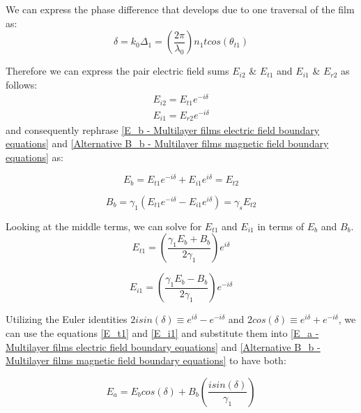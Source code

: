We can express the phase difference that develops due to one traversal of the film as:
    \begin{equation} \label{phase difference}
    \delta = k_0\Delta_1 = \left(\frac{2\pi}{\lambda_0}\right) n_1tcos(\theta_{t1})
    \end{equation}

Therefore we can express the pair electric field sums $E_{i2}$ \& $E_{t1}$ and $E_{i1}$ \& $E_{r2}$ as follows:
    \begin{align*}
        E_{i2} = E_{t1}e^{-i\delta} \\
        E_{i1} = E_{r2}e^{-i\delta}
    \end{align*}
and consequently rephrase \ref{E_b - Multilayer films electric field boundary equations} and \ref{Alternative B_b - Multilayer films magnetic field boundary equations} as:

    \begin{equation} \label{E_b form after phase difference}
    E_b = E_{t1}e^{-i\delta} + E_{i1}e^{i\delta} = E_{t2}
    \end{equation}
    
    \begin{equation} \label{B_b form after phase difference}
    B_b = \gamma_1(E_{t1}e^{-i\delta} - E_{i1}e^{i\delta}) = \gamma_sE_{t2}
    \end{equation}

Looking at the middle terms, we can solve for $E_{t1}$ and $E_{i1}$ in terms of $E_b$ and $B_b$.
    \begin{equation} \label{E_t1}
    E_{t1} = \left(\frac{\gamma_1E_b + B_b}{2\gamma_1}\right)e^{i\delta}
    \end{equation}
    
    \begin{equation} \label{E_i1}
    E_{i1} = \left(\frac{\gamma_1E_b - B_b}{2\gamma_1}\right)e^{-i\delta}
    \end{equation}

Utilizing the Euler identities $2isin(\delta) \equiv e^{i\delta} - e^{-i\delta}$ and $2cos(\delta) \equiv e^{i\delta} + e^{-i\delta}$, we can use the equations \ref{E_t1} and \ref{E_i1} and substitute them into \ref{E_a - Multilayer films electric field boundary equations} and \ref{Alternative B_b - Multilayer films magnetic field boundary equations} to have both:

    \begin{equation} \label{E_a in terms of E_b and B_b}
    E_a = E_bcos(\delta) + B_b\left(\frac{isin(\delta)}{\gamma_1}\right)
    \end{equation}
    
